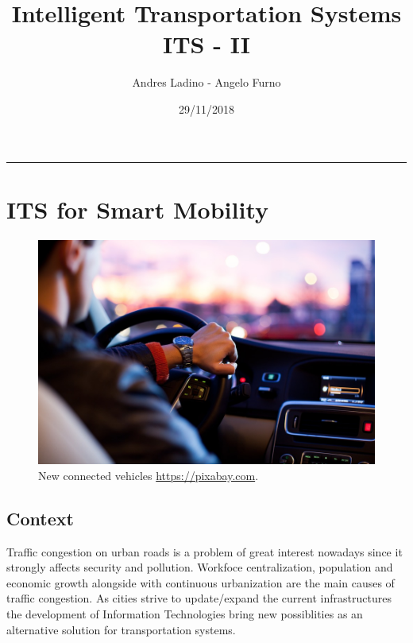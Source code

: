 \documentclass[]{book}
\title{Intelligent Transportation Systems ITS - II}
\author{Andres Ladino - Angelo Furno}
\date{29/11/2018}
\theoremstyle{definition}
\theoremstyle{definition}
\theoremstyle{definition}
\theoremstyle{remark}
\begin{document}
\maketitle

{
\hypersetup{linkcolor=black}
\setcounter{tocdepth}{1}
\tableofcontents
}
\begin{center}\rule{0.5\linewidth}{\linethickness}\end{center}

\hypertarget{its-for-smart-mobility}{%
\chapter*{ITS for Smart Mobility}\label{its-for-smart-mobility}}




\begin{figure}

{\centering \includegraphics{images/01-car} 

}

\caption{New connected vehicles
\href{Taken\%20from:\%20https://pixabay.com}{https://pixabay.com}.}\label{fig:car}
\end{figure}

\hypertarget{context}{%
\section*{Context}\label{context}}

Traffic congestion on urban roads is a problem of great interest
nowadays since it strongly affects security and pollution. Workfoce
centralization, population and economic growth alongside with continuous
urbanization are the main causes of traffic congestion. As cities strive
to update/expand the current infrastructures the development of
Information Technologies bring new possiblities as an alternative
solution for transportation systems.
\end{document}
